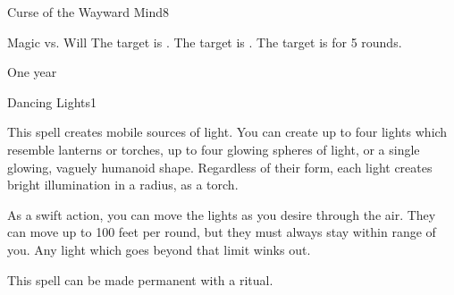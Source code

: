 \begin{spellsection}{Curse of the Wayward Mind}{8}
    \begin{spellheader}
    \end{spellheader}
    \begin{spellcontent}
        \begin{spelltargetinginfo}
        \end{spelltargetinginfo}
        \begin{spelleffects}
            \begin{spellattack}{Magic vs. Will}
                \spellsuccess The target is \disoriented.
                \spellcritical The target is \confused.
                \spellfailure The target is \disoriented for 5 rounds.
            \end{spellattack}
            \spelldur One year
        \end{spelleffects}
    \end{spellcontent}
    \begin{spellfooter}
        \spellnotes \cursespellnotes
        \miscastrandom
    \end{spellfooter}
\end{spellsection}


\begin{spellsection}{Dancing Lights}{1}
    \begin{spellheader}
    \end{spellheader}
    \begin{spellcontent}
        \begin{spelltargetinginfo}
            \spellrng{\rngmed}
        \end{spelltargetinginfo}
        \begin{spelleffects}
            \spelleffect This spell creates mobile sources of light. You can create up to four lights which resemble lanterns or torches, up to four glowing spheres of light, or a single glowing, vaguely humanoid shape. Regardless of their form, each light creates bright illumination in a \areamed radius, as a torch.

            As a swift action, you can move the lights as you desire through the air. They can move up to 100 feet per round, but they must always stay within range of you. Any light which goes beyond that limit winks out.
            \spelldur \durshort \dismissable
        \end{spelleffects}
    \end{spellcontent}
    \begin{spellfooter}
        \spellnotes This spell can be made permanent with a  ritual.
        \miscastexplode
    \end{spellfooter}
\end{spellsection}

